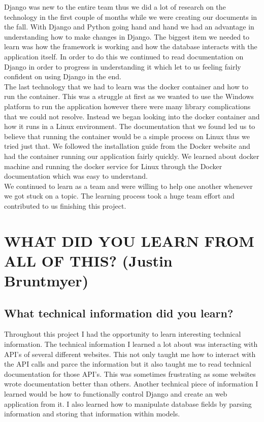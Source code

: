 \documentclass[draftclsnofoot,10pt,onecolumn]{IEEEtran} %
\begin{document}
Django was new to the entire team thus we did a lot of research on the
technology in the first couple of months while we were creating our documents in
the fall. With Django and Python going hand and hand we had an advantage in
understanding how to make changes in Django. The biggest item we needed to learn
was how the framework is working and how the database interacts with the
application itself. In order to do this we continued to read documentation on
Django in order to progress in understanding it which let to us feeling fairly
confident on using Django in the end. \\

The last technology that we had to learn was the docker container and how to run
the container. This was a struggle at first as we wanted to use the Windows
platform to run the application however there were many library complications
that we could not resolve. Instead we began looking into the docker container
and how it runs in a Linux environment. The documentation that we found led us
to believe that running the container would be a simple process on Linux thus we
tried just that. We followed the installation guide from the Docker website and
had the container running our application fairly quickly. We learned about
docker machine and running the docker service for Linux through the Docker
documentation which was easy to understand. \\

We continued to learn as a team and were willing to help one another whenever we
got stuck on a topic. The learning process took a huge team effort and
contributed to us finishing this project. \\



\section{WHAT DID YOU LEARN FROM ALL OF THIS? (Justin Bruntmyer)}

\subsection{What technical information did you learn?}
Throughout this project I had the opportunity to learn interesting technical
information. The technical information I learned a lot about was interacting
with API's of several different websites. This not only taught me how to
interact with the API calls and parce the information but it also taught me to
read technical documentation for those API's. This was sometimes frustrating as
some websites wrote documentation better than others. Another technical piece of
information I learned would be how to functionally control Django and create an
web application from it. I also learned how to manipulate database fields by
parsing information and storing that information within models. \\
\end{document}
